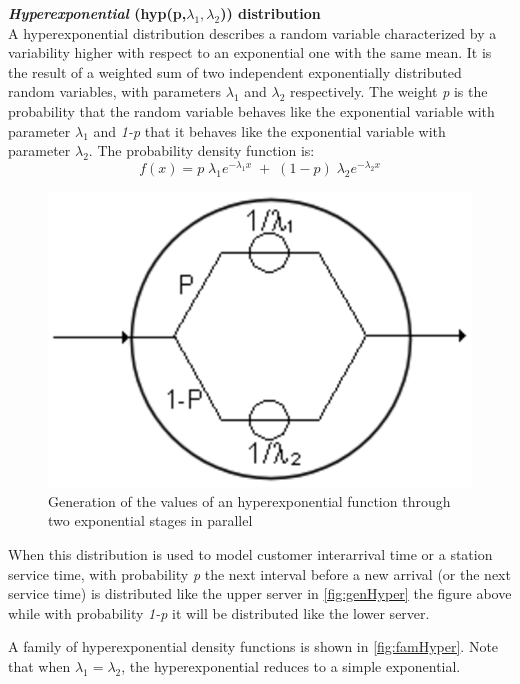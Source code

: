 \textbf{\emph{Hyperexponential} (hyp(p,$\lambda_1,\lambda_2$))
distribution}\\
A hyperexponential distribution describes a random variable
characterized by a variability higher with respect to an
exponential one with the same mean. It is the result of a weighted
sum of two independent exponentially distributed random variables,
with parameters $\lambda_1$ and $\lambda_2$ respectively. The
weight \emph{p} is the probability  that the random variable
behaves like the exponential variable with parameter $\lambda_1$
and \emph{1-p} that it behaves like the exponential variable with
parameter $\lambda_2$. The probability density function is:
\[ f(x) = p \; \lambda_1 e^{- \lambda_1 x}\; + \;
(1-p) \; \lambda_2 e^{- \lambda_2 x}
\]
\begin{figure}[htb]
    \begin{center}
        \includegraphics[scale=.5]{img/jsimg/4.7.eps}
    \end{center}
    \caption{Generation of the values of an hyperexponential function
    through two exponential stages in parallel}
    \label{fig:genHyper}
\end{figure}
When this distribution is used to model customer interarrival time
or a station service time, with probability \emph{p} the next
interval before a new arrival (or the next service time) is
distributed like the upper server in \autoref{fig:genHyper} the
figure above while with probability \emph{1-p} it will be
distributed like the lower server.

A family of hyperexponential density functions is shown in
\autoref{fig:famHyper}. Note that when $\lambda_1 = \lambda_2$,
the hyperexponential reduces to a simple exponential.\\

